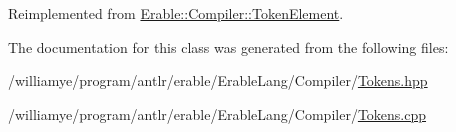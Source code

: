Reimplemented from \mbox{\hyperlink{class_erable_1_1_compiler_1_1_token_element_a1ff3e31b4064cd22463c91130a819646}{Erable\+::\+Compiler\+::\+Token\+Element}}.



The documentation for this class was generated from the following files\+:\begin{DoxyCompactItemize}
\item 
/williamye/program/antlr/erable/\+Erable\+Lang/\+Compiler/\mbox{\hyperlink{_tokens_8hpp}{Tokens.\+hpp}}\item 
/williamye/program/antlr/erable/\+Erable\+Lang/\+Compiler/\mbox{\hyperlink{_tokens_8cpp}{Tokens.\+cpp}}\end{DoxyCompactItemize}
